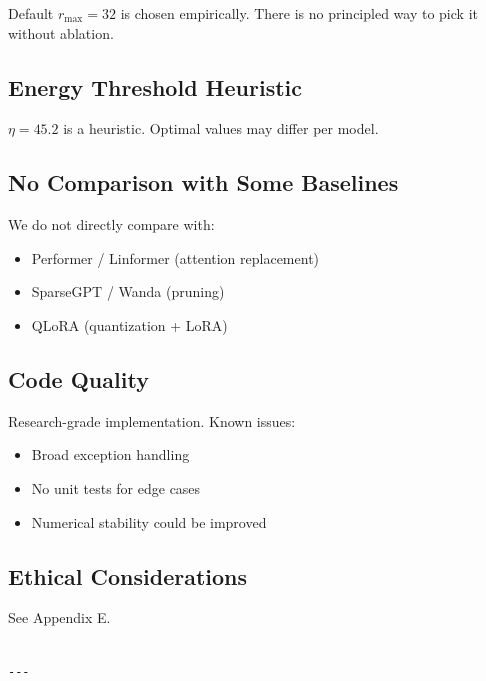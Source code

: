 Default $r_\text{max} = 32$ is chosen empirically. There is no 
principled way to pick it without ablation.

\subsection{Energy Threshold Heuristic}

$\eta = 45.2$ is a heuristic. Optimal values may differ per model.

\subsection{No Comparison with Some Baselines}

We do not directly compare with:
\begin{itemize}
\item Performer / Linformer (attention replacement)
\item SparseGPT / Wanda (pruning)
\item QLoRA (quantization + LoRA)

\end{itemize}
\subsection{Code Quality}

Research-grade implementation. Known issues:
\begin{itemize}
\item Broad exception handling
\item No unit tests for edge cases
\item Numerical stability could be improved

\end{itemize}
\subsection{Ethical Considerations}

See Appendix E.
\begin{lstlisting}

---
\end{lstlisting}